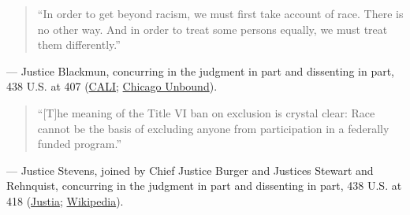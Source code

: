 \documentclass[12pt]{article}
\begin{document}
\begin{quote}
``In order to get beyond racism, we must first take account of race. There is no other way. And in order to treat some persons equally, we must treat them differently.''
\end{quote}
\noindent --- Justice Blackmun, concurring in the judgment in part and dissenting in part, 438 U.S. at 407 (\href{https://liberty.lawbooks.cali.org/chapter/race-and-equal-protection-part-2/}{CALI}; \href{https://chicagounbound.uchicago.edu/cgi/viewcontent.cgi?article=11890&context=journal_articles}{Chicago Unbound}).

\begin{quote}
``[T]he meaning of the Title VI ban on exclusion is crystal clear: Race cannot be the basis of excluding anyone from participation in a federally funded program.''
\end{quote}
\noindent --- Justice Stevens, joined by Chief Justice Burger and Justices Stewart and Rehnquist, concurring in the judgment in part and dissenting in part, 438 U.S. at 418 (\href{https://supreme.justia.com/cases/federal/us/438/265/}{Justia}; \href{https://en.wikipedia.org/wiki/Regents_of_the_University_of_California_v._Bakke}{Wikipedia}).
\end{document}
